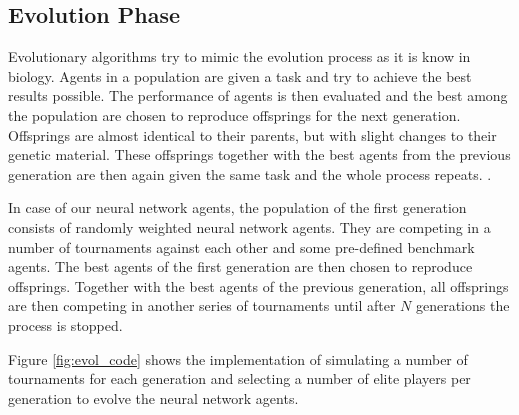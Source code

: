 \subsection{Evolution Phase}
Evolutionary algorithms try to mimic the evolution process as it is know in biology. Agents in a population are given a task and try to achieve the best results possible. The performance of agents is then evaluated and the best among the population are chosen to reproduce offsprings for the next generation. Offsprings are almost identical to their parents, but with slight changes to their genetic material. These offsprings together with the best agents from the previous generation are then again given the same task and the whole process repeats. \cite{evolutionary_methods, nn_evolve}. \par
In case of our neural network agents, the population of the first generation consists of randomly weighted neural network agents. They are competing in a number of tournaments against each other and some pre-defined benchmark agents. The best agents of the first generation are then chosen to reproduce offsprings. Together with the best agents of the previous generation, all offsprings are then competing in another series of tournaments until after $N$ generations the process is stopped. \par
Figure \ref{fig:evol_code} shows the implementation of simulating a number of tournaments for each generation and selecting a number of elite players per generation to evolve the neural network agents. \par
{}
\pagebreak
